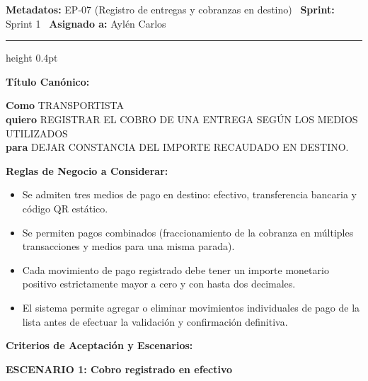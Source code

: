 \documentclass[a4paper,9pt]{article}
\begin{document}
\begin{tcolorbox}[hucard, title={\textbf{HU-31: REGISTRAR COBRANZA} \hfill \scriptsize \colorbox{slatestatus}{\textbf{\ Done\ }} \quad \colorbox{white}{\textcolor{primarydark}{\textbf{\ 5 pts\ }}}}]
\vspace{-1pt}
\noindent\textbf{\footnotesize Metadatos:} EP-07 (Registro de entregas y cobranzas en destino) \textbar\ \textbf{Sprint:} Sprint 1 \textbar\ \textbf{Asignado a:} Aylén Carlos\par\vspace{2pt}
\hrule height 0.4pt\par\vspace{3pt}
\noindent\textbf{\footnotesize Título Canónico:}\par\vspace{1pt}
{\small \textbf{Como} TRANSPORTISTA \\ \textbf{quiero} REGISTRAR EL COBRO DE UNA ENTREGA SEGÚN LOS MEDIOS UTILIZADOS \\ \textbf{para} DEJAR CONSTANCIA DEL IMPORTE RECAUDADO EN DESTINO.}\par\vspace{3pt}
\noindent\textbf{\footnotesize Reglas de Negocio a Considerar:}\par\vspace{1pt}
{\footnotesize
\begin{itemize}[leftmargin=12pt, nosep, itemsep=1.5pt, topsep=1pt]
\item Se admiten tres medios de pago en destino: efectivo, transferencia bancaria y código QR estático.
\item Se permiten pagos combinados (fraccionamiento de la cobranza en múltiples transacciones y medios para una misma parada).
\item Cada movimiento de pago registrado debe tener un importe monetario positivo estrictamente mayor a cero y con hasta dos decimales.
\item El sistema permite agregar o eliminar movimientos individuales de pago de la lista antes de efectuar la validación y confirmación definitiva.
\end{itemize}
}\par\vspace{3pt}
\noindent\textbf{\footnotesize Criterios de Aceptación y Escenarios:}\par\vspace{2pt}
{\footnotesize
\noindent\textbf{\textcolor{secondarydark}{ESCENARIO 1:  Cobro registrado en efectivo}}\par\vspace{1pt}
}
\end{tcolorbox}
\end{document}
